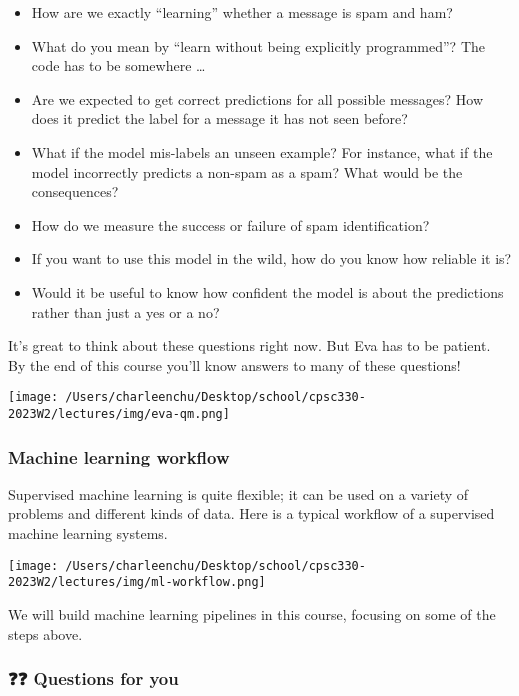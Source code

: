 \documentclass[11pt]{article}
\providecommand{\tightlist}{%
      \setlength{\itemsep}{0pt}\setlength{\parskip}{0pt}}
\begin{document}
\begin{itemize}
\tightlist
\item
  How are we exactly ``learning'' whether a message is spam and ham?
\item
  What do you mean by ``learn without being explicitly programmed''? The
  code has to be somewhere \ldots{}
\item
  Are we expected to get correct predictions for all possible messages?
  How does it predict the label for a message it has not seen before?\\
\item
  What if the model mis-labels an unseen example? For instance, what if
  the model incorrectly predicts a non-spam as a spam? What would be the
  consequences?
\item
  How do we measure the success or failure of spam identification?
\item
  If you want to use this model in the wild, how do you know how
  reliable it is?\\
\item
  Would it be useful to know how confident the model is about the
  predictions rather than just a yes or a no?
\end{itemize}

It's great to think about these questions right now. But Eva has to be
patient. By the end of this course you'll know answers to many of these
questions!

\texttt{[image: /Users/charleenchu/Desktop/school/cpsc330-2023W2/lectures/img/eva-qm.png]}

    \subsubsection{Machine learning
workflow}\label{machine-learning-workflow}

Supervised machine learning is quite flexible; it can be used on a
variety of problems and different kinds of data. Here is a typical
workflow of a supervised machine learning systems.

\texttt{[image: /Users/charleenchu/Desktop/school/cpsc330-2023W2/lectures/img/ml-workflow.png]}

We will build machine learning pipelines in this course, focusing on
some of the steps above.

    

    \subsubsection{❓❓ Questions for you}\label{questions-for-you}
\end{document}
